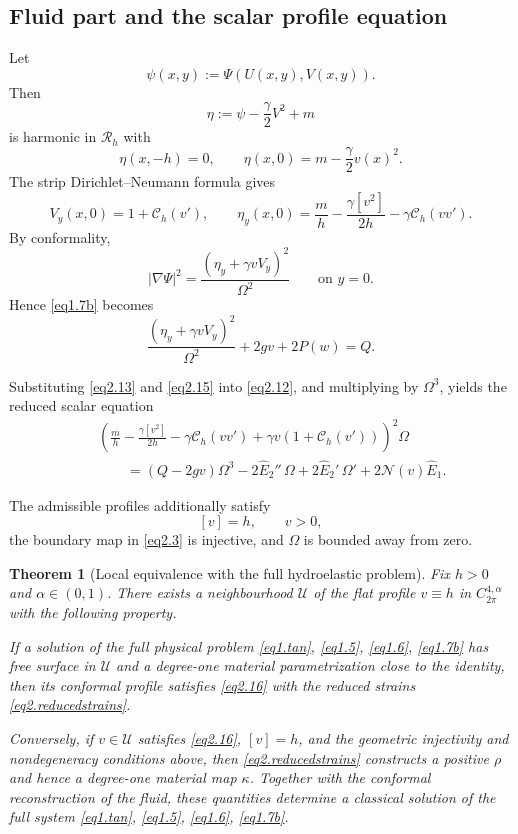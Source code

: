 \documentclass[12pt]{article}
\numberwithin{equation}{section}
\newtheorem{theorem}{Theorem}[section]
\numberwithin{equation}{section}
\begin{document}
\subsection{Fluid part and the scalar profile equation}

Let
\[
\psi(x,y):=\Psi(U(x,y),V(x,y)).
\]
Then
\[
\eta:=\psi-\frac{\gamma}{2}V^2+m
\]
is harmonic in $\mathcal R_h$ with
\[
\eta(x,-h)=0,\qquad
\eta(x,0)=m-\frac{\gamma}{2}v(x)^2.
\]
The strip Dirichlet--Neumann formula gives
\begin{equation}\label{eq2.13}
V_y(x,0)=1+\mathcal C_h(v'),
\qquad
\eta_y(x,0)
=
\frac mh-\frac{\gamma[v^2]}{2h}
-\gamma\mathcal C_h(vv').
\end{equation}
By conformality,
\[
|\nabla\Psi|^2
=
\frac{(\eta_y+\gamma vV_y)^2}{\Omega^2}
\qquad\text{on }y=0.
\]
Hence \eqref{eq1.7b} becomes
\begin{equation}\label{eq2.12}
\frac{(\eta_y+\gamma vV_y)^2}{\Omega^2}
+2gv+2P(w)=Q.
\end{equation}

Substituting \eqref{eq2.13} and \eqref{eq2.15} into \eqref{eq2.12}, and multiplying
by $\Omega^3$, yields the reduced scalar equation
\begin{eqnarray}\label{eq2.16}
&&
\left(
\frac mh-\frac{\gamma[v^2]}{2h}
-\gamma\mathcal C_h(vv')
+\gamma v(1+\mathcal C_h(v'))
\right)^2\Omega
\nonumber\\
&&\qquad
=(Q-2gv)\Omega^3
-2\widehat E_2''\,\Omega
+2\widehat E_2'\,\Omega'
+2\mathcal N(v)\widehat E_1 .
\end{eqnarray}

The admissible profiles additionally satisfy
\[
[v]=h,\qquad v>0,
\]
the boundary map in \eqref{eq2.3} is injective, and $\Omega$ is bounded away from zero.

\begin{theorem}[Local equivalence with the full hydroelastic problem]\label{thm2equiv}
Fix $h>0$ and $\alpha\in(0,1)$.  There exists a neighbourhood $\mathcal U$ of
the flat profile $v\equiv h$ in $C^{4,\alpha}_{2\pi}$ with the following property.

If a solution of the full physical problem
\eqref{eq1.tan}, \eqref{eq1.5}, \eqref{eq1.6}, \eqref{eq1.7b}
has free surface in $\mathcal U$ and a degree-one material parametrization close to the
identity, then its conformal profile satisfies \eqref{eq2.16} with the reduced strains
\eqref{eq2.reducedstrains}.

Conversely, if $v\in\mathcal U$ satisfies \eqref{eq2.16}, $[v]=h$, and the geometric
injectivity and nondegeneracy conditions above, then \eqref{eq2.reducedstrains}
constructs a positive $\rho$ and hence a degree-one material map $\kappa$.  Together
with the conformal reconstruction of the fluid, these quantities determine a classical
solution of the full system
\eqref{eq1.tan}, \eqref{eq1.5}, \eqref{eq1.6}, \eqref{eq1.7b}.
\end{theorem}
\end{document}
